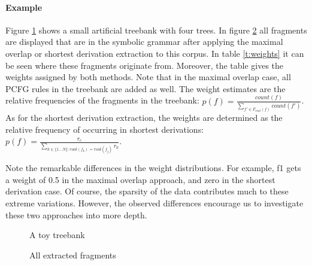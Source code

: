 \paragraph{Example}
\FloatBarrier
Figure \ref{f:treebank} shows a small artificial treebank with four trees. In figure \ref{f:fragments} all fragments are displayed that are in the symbolic grammar after applying the maximal overlap or shortest derivation extraction to this corpus. In table \ref{t:weights} it can be seen where these fragments originate from. Moreover, the table gives the weights assigned by both methods. Note that in the maximal overlap case, all PCFG rules in the treebank are added as well. The weight estimates are the relative frequencies of the fragments in the treebank: $p(f)=\frac{count(f)}{\sum_{f'\in F_{root}(f)} count(f')}$\cite{sangati2011}. As for the shortest derivation extraction, the weights are determined as the relative frequency of occurring in shortest derivations: $p(f)=\frac{r_c}{\sum_{k\in \{1\ldots N\}:root(f_k)=root(f_j)} r_k}$\cite{zollmann2005}.

Note the remarkable differences in the weight distributions. For example, f1 gets a weight of 0.5 in the maximal overlap approach, and zero in the shortest derivation case. Of course, the sparsity of the data contributes much to these extreme variations. However, the observed differences encourage us to investigate these two approaches into more depth.


\begin{figure}[h!]
\center 
\caption{A toy treebank} \label{f:treebank}
\end{figure}

\begin{figure}[h!]
\center 
\caption{All extracted fragments}
\label{f:fragments}
\end{figure}

